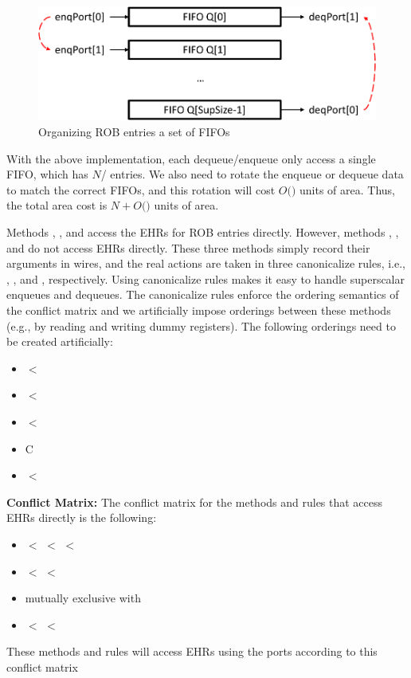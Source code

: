 \begin{figure}[!htb]
    \centering
    \includegraphics[width=0.6\columnwidth]{fig/rob_rotate_fifos_crop.pdf}
    \caption{Organizing ROB entries a set of FIFOs}\label{fig:rob-rotate-fifos}
\end{figure}

With the above implementation, each dequeue/enqueue only access a single FIFO, which has $N$/ entries.
We also need to rotate the enqueue or dequeue data to match the correct FIFOs, and this rotation will cost $O($$)$ units of area.
Thus, the total area cost is $N +O($$)$ units of area.

Methods , ,  and  access the EHRs for ROB entries directly.
However, methods , , and  do not access EHRs directly.
These three methods simply record their arguments in wires, and the real actions are taken in three canonicalize rules, i.e., , , and , respectively.
Using canonicalize rules makes it easy to handle superscalar enqueues and dequeues.
The canonicalize rules enforce the ordering semantics of the conflict matrix and we artificially impose orderings between these methods (e.g., by reading and writing dummy registers).
The following orderings need to be created artificially:
\begin{itemize}
    \item {} $<$ 
    \item {} $<$ 
    \item {} $<$ 
    \item {} C 
    \item {} $<$ 
\end{itemize}

\noindent\textbf{Conflict Matrix:}
The conflict matrix for the methods and rules that access EHRs directly is the following:
\begin{itemize}
    \item {} $<$  $<$  $<$ 
    \item {} $<$  $<$ 
    \item {} mutually exclusive with 
    \item {} $<$  $<$ 
\end{itemize}
These methods and rules will access EHRs using the ports according to this conflict matrix

